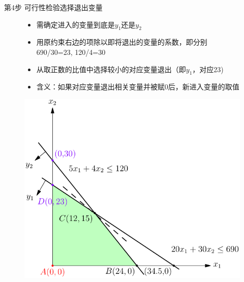\documentclass[mathserif, table]{beamer}
\begin{document}
\begin{frame}{第4步 可行性检验选择退出变量}
  \begin{figure}
    \begin{minipage}{.5\linewidth}
      \begin{itemize}
      \item 需确定进入的变量到底是$y_1$还是$y_2$
      \item 用原约束右边的项除以即将退出的变量的系数，即分别690/30=23, 120/4=30
      \item 从取正数的比值中选择较小的对应变量退出（即$y_1$，对应23)
      \item 含义：如果对应变量退出相关变量并被赋0后，新进入变量的取值
      \end{itemize}
    \end{minipage}%
    \begin{minipage}{.5\linewidth}
      \includegraphics[width=\textwidth{}]{simplex-feasible.pdf}
    \end{minipage}
  \end{figure}  
\end{frame}
\end{document}
